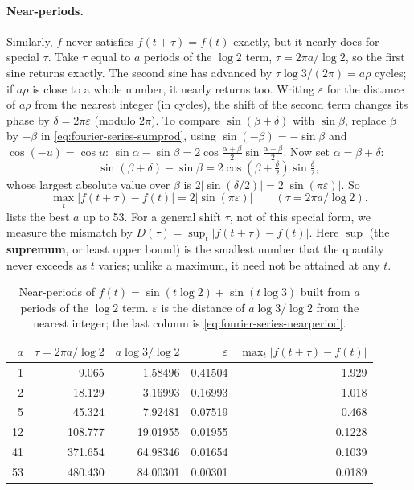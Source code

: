 \paragraph{Near-periods.} Similarly, $f$ never satisfies $f(t+\tau)=f(t)$ exactly, but it nearly does for special $\tau$. Take $\tau$ equal to $a$ periods of the $\log2$ term, $\tau=2\pi a/\log2$, so the first sine returns exactly. The second sine has advanced by $\tau\log3/(2\pi)=a\rho$ cycles; if $a\rho$ is close to a whole number, it nearly returns too. Writing $\varepsilon$ for the distance of $a\rho$ from the nearest integer (in cycles), the shift of the second term changes its phase by $\delta=2\pi\varepsilon$ (modulo $2\pi$). To compare $\sin(\beta+\delta)$ with $\sin\beta$, replace $\beta$ by $-\beta$ in \cref{eq:fourier-series-sumprod}, using $\sin(-\beta)=-\sin\beta$ and $\cos(-u)=\cos u$: $\sin\alpha-\sin\beta=2\cos\frac{\alpha+\beta}{2}\sin\frac{\alpha-\beta}{2}$. Now set $\alpha=\beta+\delta$:
\begin{equation}
\sin(\beta+\delta)-\sin\beta=2\cos\!\left(\beta+\tfrac\delta2\right)\sin\tfrac\delta2,
\end{equation}
whose largest absolute value over $\beta$ is $2|\sin(\delta/2)|=2|\sin(\pi\varepsilon)|$. So
\begin{equation}
\max_t|f(t+\tau)-f(t)|=2|\sin(\pi\varepsilon)|\qquad(\tau=2\pi a/\log2).
\label{eq:fourier-series-nearperiod}
\end{equation}
 lists the best $a$ up to 53. For a general shift $\tau$, not of this special form, we measure the mismatch by $D(\tau)=\sup_t|f(t+\tau)-f(t)|$. Here $\sup$ (the \textbf{supremum}, or least upper bound) is the smallest number that the quantity never exceeds as $t$ varies; unlike a maximum, it need not be attained at any $t$.

\begin{table}[htbp]\centering
\caption{Near-periods of $f(t)=\sin(t\log2)+\sin(t\log3)$ built from $a$ periods of the $\log 2$ term. $\varepsilon$ is the distance of $a\log3/\log2$ from the nearest integer; the last column is \cref{eq:fourier-series-nearperiod}.}
\label{tab:fourier-series-nearperiods}
\begin{tabular}{rrrrr}
\toprule
$a$ & $\tau=2\pi a/\log2$ & $a\log3/\log2$ & $\varepsilon$ & $\max_t|f(t+\tau)-f(t)|$\\
\midrule
1 & 9.065 & 1.58496 & 0.41504 & 1.929\\
2 & 18.129 & 3.16993 & 0.16993 & 1.018\\
5 & 45.324 & 7.92481 & 0.07519 & 0.468\\
12 & 108.777 & 19.01955 & 0.01955 & 0.1228\\
41 & 371.654 & 64.98346 & 0.01654 & 0.1039\\
53 & 480.430 & 84.00301 & 0.00301 & 0.0189\\
\bottomrule
\end{tabular}
\end{table}


